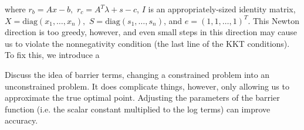 where $r_b = Ax - b,$ $r_c = A^T\lambda + s - c$, $I$ is an appropriately-sized identity matrix, $X = \text{diag}(x_1,\ldots,x_n),$
$S = \text{diag}(s_1,\ldots,s_n)$, and $e = (1,1,\ldots,1)^T$. 
This Newton direction is too greedy, however, and even small steps in this direction may cause us to violate the nonnegativity
condition (the last line of the KKT conditions). To fix this, we introduce a 


Discuss the idea of barrier terms, changing a constrained problem into an unconstrained problem. It does complicate things, however, only allowing us to approximate the true optimal point. Adjusting the parameters of the barrier function (i.e. the scalar constant multiplied to the log terms) can improve accuracy. 